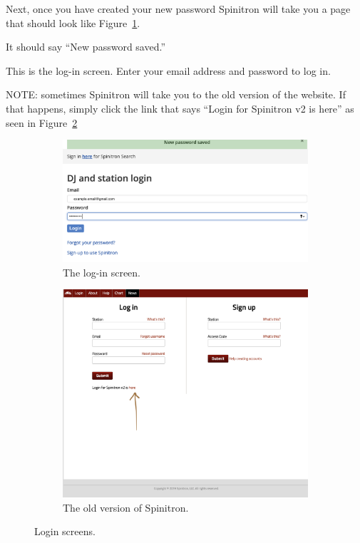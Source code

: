 \documentclass[12pt]{article}
\begin{document}

 Next, once you have created your new password Spinitron will take you a page that should look like Figure~\ref{fig3a}. 

It should say ``New password saved.''

This is the log-in screen. Enter your email address and password to log in.

NOTE: sometimes Spinitron will take you to the old version of the website. If that happens, simply click the link that says ``Login for Spinitron v2 is here'' as seen in Figure~\ref{fig3b}

\begin{figure}[h]
 
    \begin{subfigure}{0.6\textwidth}
    \includegraphics[width=0.9\linewidth]{images/login_after_password.png} 
    \caption{The log-in screen.}
    \label{fig3a}
    \end{subfigure}
    \begin{subfigure}{0.4\textwidth}
    \includegraphics[width=0.9\linewidth]{images/old_version.png}
    \caption{The old version of Spinitron.}
    \label{fig3b}
    \end{subfigure}
 
\caption{Login screens.}
\label{fig:image2}
\end{figure}
\end{document}

